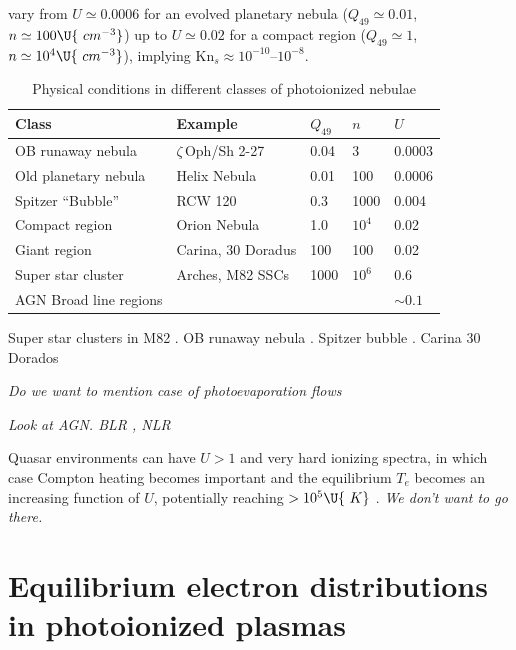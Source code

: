 \documentclass{emulateapj}
\newcommand\Kn{\ensuremath{\mathrm{Kn}}}
\newcommand\hii{\ion{H}{2}}
\begin{document}
vary from \(U \simeq 0.0006\)
for an evolved planetary nebula (\(Q_{49} \simeq 0.01\),
\(n \simeq 100\U{\ cm^{-3}}\))
up to \(U \simeq 0.02\)
for a compact \hii{} region (\(Q_{49} \simeq 1\),
\(n \simeq 10^{4}\U{\ cm^{-3}}\)),
implying \(\Kn_{s} \approx 10^{-10}\)--\(10^{-8}\).

\begin{table}
  \centering
  \caption{Physical conditions in different classes of photoionized nebulae}
  \label{tab:ion-param}
  \begin{tabular}{lllll}\hline
    Class & Example & \(Q_{49}\) & \(n\) & \(U\)\\ \hline
    OB runaway nebula & \(\zeta\)\,Oph/Sh 2-27 & 0.04 & 3 & 0.0003 \\
    Old planetary nebula & Helix Nebula & 0.01 & 100 & 0.0006 \\
    Spitzer ``Bubble'' & RCW 120 & 0.3 & 1000 & 0.004 \\
    Compact \hii{} region & Orion Nebula & 1.0 & \(10^4\) & 0.02 \\
    Giant \hii{} region & Carina, 30 Doradus &  100 & 100 & 0.02 \\ 
    Super star cluster & Arches, M82 SSCs & 1000 & \(10^6\) & 0.6 \\
    AGN Broad line regions & & & & \(\sim 0.1\) \\
    \hline
  \end{tabular}
\end{table}

Super star clusters in M82 \citep{McCrady:2007a, Krumholz:2009a}.  OB
runaway nebula \citep{Gvaramadze:2012a}.  Spitzer bubble
\citep{Deharveng:2009a}. Carina \citep{Smith:2008a} 30 Dorados \citep{Torres-Flores:2013a}

\textit{Do we want to mention case of photoevaporation flows}

\textit{Look at AGN.  BLR \citep{Baskin:2014a}, NLR
  \citep{Dopita:2002a, Groves:2004a} }

Quasar environments can have \(U > 1\)
and very hard ionizing spectra, in which case Compton heating becomes
important and the equilibrium \(T_e\)
becomes an increasing function of \(U\),
potentially reaching \(> 10^5\U{\ K}\)
\cite{Sazonov:2004a}.  \textit{We don't want to go there.}


\section{Equilibrium electron distributions in photoionized plasmas}
\label{sec:equil-electr-distr}
\newcommand\fu{\ensuremath{f_{\!u}}}
\newcommand\XXdfudt{\ensuremath{\frac{\partial \fu}{\partial t}}}
\newcommand\Xdfudt{\ensuremath{\partial \fu/\partial t}}
\newcommand\Dfudt[1]{\biggl( \XXdfudt \biggr)_{\!\scriptscriptstyle\mathrm{#1}}}
\newcommand\dfudt[1]{\ensuremath{(\Xdfudt)_{\scriptscriptstyle\mathrm{#1}}}}
\end{document}
